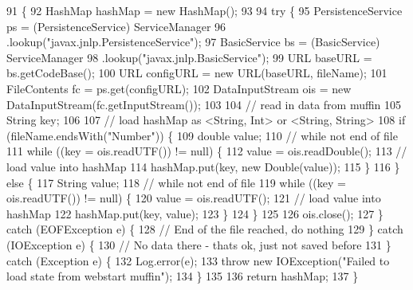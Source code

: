\begin{DoxyCode}
91                                                                 \{
92         HashMap hashMap = \textcolor{keyword}{new} HashMap();
93 
94         \textcolor{keywordflow}{try} \{
95             PersistenceService ps = (PersistenceService) ServiceManager
96                     .lookup(\textcolor{stringliteral}{"javax.jnlp.PersistenceService"});
97             BasicService bs = (BasicService) ServiceManager
98                     .lookup(\textcolor{stringliteral}{"javax.jnlp.BasicService"});
99             URL baseURL = bs.getCodeBase();
100             URL configURL = \textcolor{keyword}{new} URL(baseURL, fileName);
101             FileContents fc = ps.get(configURL);
102             DataInputStream ois = \textcolor{keyword}{new} DataInputStream(fc.getInputStream());
103 
104             \textcolor{comment}{// read in data from muffin}
105             String key;
106 
107             \textcolor{comment}{// load hashMap as <String, Int> or <String, String>}
108             \textcolor{keywordflow}{if} (fileName.endsWith(\textcolor{stringliteral}{"Number"})) \{
109                 \textcolor{keywordtype}{double} value;
110                 \textcolor{comment}{// while not end of file}
111                 \textcolor{keywordflow}{while} ((key = ois.readUTF()) != null) \{
112                     value = ois.readDouble();
113                     \textcolor{comment}{// load value into hashMap}
114                     hashMap.put(key, \textcolor{keyword}{new} Double(value));
115                 \}
116             \} \textcolor{keywordflow}{else} \{
117                 String value;
118                 \textcolor{comment}{// while not end of file}
119                 \textcolor{keywordflow}{while} ((key = ois.readUTF()) != null) \{
120                     value = ois.readUTF();
121                     \textcolor{comment}{// load value into hashMap}
122                     hashMap.put(key, value);
123                 \}
124             \}
125 
126             ois.close();
127         \} \textcolor{keywordflow}{catch} (EOFException e) \{
128             \textcolor{comment}{// End of the file reached, do nothing}
129         \} \textcolor{keywordflow}{catch} (IOException e) \{
130             \textcolor{comment}{// No data there - thats ok, just not saved before}
131         \} \textcolor{keywordflow}{catch} (Exception e) \{
132             Log.error(e);
133             \textcolor{keywordflow}{throw} \textcolor{keyword}{new} IOException(\textcolor{stringliteral}{"Failed to load state from webstart muffin"});
134         \}
135 
136         \textcolor{keywordflow}{return} hashMap;
137     \}
\end{DoxyCode}
\mbox{\label{classorg_1_1newdawn_1_1slick_1_1muffin_1_1_webstart_muffin_a4109511b5120d8588fcb4543202d9763}} 

